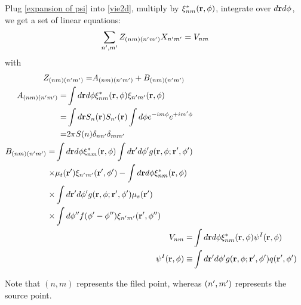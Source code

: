 \documentclass[main]{subfiles}
\begin{document}
Plug \eqref{expansion of psi} into \eqref{vie2d}, multiply by
$\xi_{nm}^{*}(\mathbf{r},\phi)$, integrate over $d\mathbf{r}d\phi$, we get a set of linear
equations:
\begin{equation*}
	\sum\limits_{n^{\prime},m^{\prime}}Z_{(nm)(n^{\prime} m^{\prime})}X_{n^{\prime} m^{\prime}}=V_{nm}
\end{equation*}
with
\begin{align*}
	\begin{split} 
		Z_{(nm)(n^{\prime} m^{\prime})} =& A_{(nm)(n^{\prime} m^{\prime})}+B_{(nm)(n^{\prime} m^{\prime})}
	\end{split}
	\\
	\begin{split} 
		A_{(nm)(n^{\prime} m^{\prime})} =& \int d\mathbf{r}d\phi\xi_{nm}^{*}(\mathbf{r},\phi)
		\xi_{n^{\prime} m^{\prime}}(\mathbf{r},\phi) \\ =& \int d\mathbf{r} S_n(\mathbf{r}) 
		S_{n^{\prime}}(\mathbf{r}) \int d\phi e^{-i m \phi} e^{+i m^{\prime} \phi} \\ =& 
		2\pi S(n) \delta_{nn^{\prime}}\delta_{mm^{\prime}}
	\end{split}
	\\
	\begin{split} 
		B_{(nm)(n^{\prime} m^{\prime})} =& \int d\mathbf{r}d\phi\xi_{nm}^{*}(\mathbf{r},\phi)
		\int d\mathbf{r}^{\prime} d\phi^{\prime} g(\mathbf{r},\phi;\mathbf{r}^{\prime},\phi^{\prime}) \\
		\times& \mu_t(\mathbf{r}^{\prime})\xi_{n^{\prime} m^{\prime}}(\mathbf{r}^{\prime},\phi^{\prime}) -
		\int d\mathbf{r}d\phi\xi_{nm}^{*}(\mathbf{r},\phi) \\ \times&
		\int d\mathbf{r}^{\prime} d\phi^{\prime} g(\mathbf{r},\phi;\mathbf{r}^{\prime},\phi^{\prime})
		\mu_s(\mathbf{r}^{\prime}) \\ \times& \int d\phi^{{\prime\prime}}
		f(\phi^{\prime}-\phi^{{\prime\prime}})\xi_{n^{\prime} m^{\prime}}(\mathbf{r}^{\prime},\phi^{{\prime\prime}})
	\end{split}
	\\
	V_{nm} =& \int d\mathbf{r}d\phi\xi_{nm}^{*}(\mathbf{r},\phi)\psi^I(\mathbf{r},\phi)
	\\
	\psi^I(\mathbf{r},\phi) \equiv& \int d\mathbf{r}^{\prime} d\phi^{\prime}
	g(\mathbf{r},\phi;\mathbf{r}^{\prime},\phi^{\prime})q(\mathbf{r}^{\prime},\phi^{\prime})
\end{align*}

Note that $(n,m)$ represents the filed point, whereas $(n^{\prime},m^{\prime})$ represents 
the source point.
\end{document}

